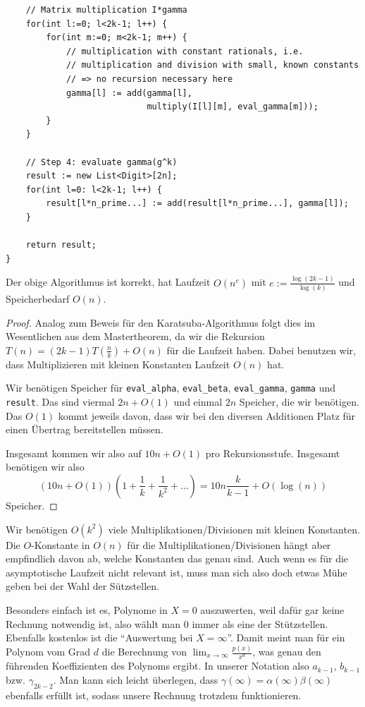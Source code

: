 \begin{algorithm}
\begin{lstlisting}
    // Matrix multiplication I*gamma
    for(int l:=0; l<2k-1; l++) {
        for(int m:=0; m<2k-1; m++) {
            // multiplication with constant rationals, i.e.
            // multiplication and division with small, known constants
            // => no recursion necessary here
            gamma[l] := add(gamma[l],
                            multiply(I[l][m], eval_gamma[m]));
        }
    }

    // Step 4: evaluate gamma(g^k)
    result := new List<Digit>[2n];
    for(int l=0: l<2k-1; l++) {
        result[l*n_prime...] := add(result[l*n_prime...], gamma[l]);
    }

    return result;
}
    \end{lstlisting}
\end{algorithm}

\begin{proposition}
    Der obige Algorithmus ist korrekt, hat Laufzeit $O(n^e)$ mit $e:=\frac{\log(2k-1)}{\log(k)}$ und Speicherbedarf $O(n)$.
\end{proposition}
\begin{proof}
    Analog zum Beweis für den Karatsuba-Algorithmus folgt dies im Wesentlichen aus dem Mastertheorem, da wir die Rekursion $T(n) = (2k-1)T(\frac{n}{k})+O(n)$ für die Laufzeit haben. Dabei benutzen wir, dass Multiplizieren mit kleinen Konstanten Laufzeit $O(n)$ hat.

    Wir benötigen Speicher für \texttt{eval\_alpha}, \texttt{eval\_beta}, \texttt{eval\_gamma}, \texttt{gamma} und \texttt{result}. Das sind viermal $2n+O(1)$ und einmal $2n$ Speicher, die wir benötigen. Das $O(1)$ kommt jeweils davon, dass wir bei den diversen Additionen Platz für einen Übertrag bereitstellen müssen.

    Insgesamt kommen wir also auf $10n+O(1)$ pro Rekursionsstufe. Insgesamt benötigen wir also \[(10n+O(1))\left(1+\frac{1}{k}+\frac{1}{k^2}+\ldots\right) = 10n\frac{k}{k-1}+O(\log(n))\]
    Speicher.
\end{proof}

\begin{remark}
    Wir benötigen $O(k^2)$ viele Multiplikationen/Divisionen mit kleinen Konstanten. Die $O$-Konstante in $O(n)$ für die Multiplikationen/Divisionen hängt aber empfindlich davon ab, welche Konstanten das genau sind. Auch wenn es für die asymptotische Laufzeit nicht relevant ist, muss man sich also doch etwas Mühe geben bei der Wahl der Sützstellen.

    \smallskip
    Besonders einfach ist es, Polynome in $X=0$ auszuwerten, weil dafür gar keine Rechnung notwendig ist, also wählt man $0$ immer als eine der Stützstellen. Ebenfalls kostenlos ist die \enquote{Auswertung bei $X=\infty$}. Damit meint man für ein Polynom vom Grad $d$ die Berechnung von $\lim_{x\to\infty} \frac{p(x)}{x^d}$, was genau den führenden Koeffizienten des Polynoms ergibt. In unserer Notation also $a_{k-1}$, $b_{k-1}$ bzw. $\gamma_{2k-2}$. Man kann sich leicht überlegen, dass $\gamma(\infty)=\alpha(\infty)\beta(\infty)$ ebenfalls erfüllt ist, sodass unsere Rechnung trotzdem funktionieren.
\end{remark}


